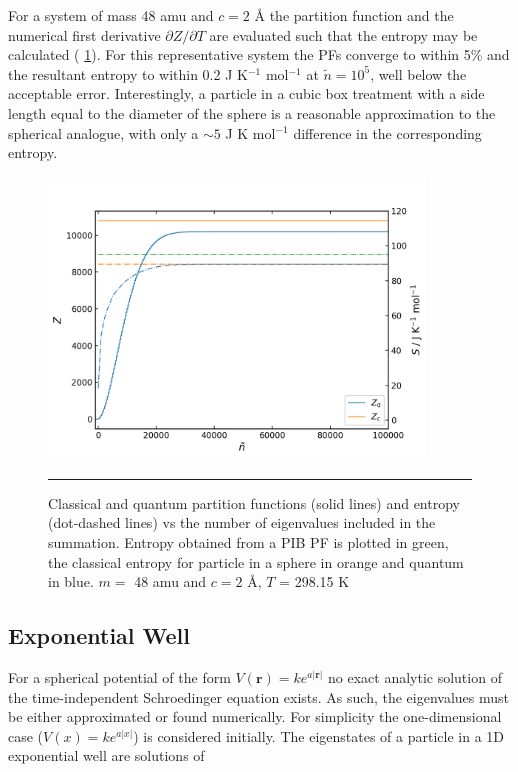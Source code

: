 \documentclass[../main.tex]{subfiles}
\begin{document}
For a system of mass 48 amu and $c = 2$ Å the partition function and the numerical first derivative $\partial Z / \partial T$ are evaluated such that the entropy may be calculated (\figurename{ \ref{spherical_well_z_s_qunat_classical}}). For this representative system the PFs converge to within 5\% and the resultant entropy to within 0.2 J K$^{-1}$ mol$^{-1}$ at $\tilde{n} = 10^5$, well below the acceptable error. Interestingly, a particle in a cubic box treatment with a side length equal to the diameter of the sphere is a reasonable approximation to the spherical analogue, with only a $\sim 5$ J K mol$^{-1}$ difference in the corresponding entropy.

\begin{figure}[h!]
	\centering
	\includegraphics[height=7.5cm]{4/figs/spherical_well_z_s_qunat_classical}
	\vspace{0.2cm}
	\hrule
	\caption{Classical and quantum partition functions (solid lines) and entropy (dot-dashed lines) vs the number of eigenvalues included in the summation. Entropy obtained from a PIB PF is plotted in green, the classical entropy for particle in a sphere in orange and quantum in blue. $m =$ 48 amu and $c = 2$ Å, $T$ = 298.15 K} 
	\label{spherical_well_z_s_qunat_classical}
\end{figure}


\subsection{Exponential Well}
For a spherical potential of the form $V(\boldsymbol{r}) = k e^{a|\boldsymbol{r}|}$ no exact analytic solution of the time-independent Schroedinger equation exists. As such, the eigenvalues must be either approximated or found numerically. For simplicity the one-dimensional case ($V(x) = k e^{a|x|}$) is considered initially. The eigenstates of a particle in a 1D exponential well are solutions of
\end{document}
